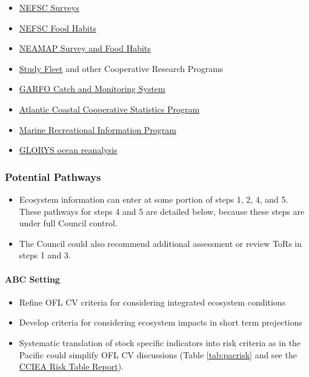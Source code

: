 \documentclass[
]{article}
\providecommand{\tightlist}{%
  \setlength{\itemsep}{0pt}\setlength{\parskip}{0pt}}
\begin{document}
\begin{itemize}
\tightlist
\item
  \href{https://www.fisheries.noaa.gov/inport/item/22549}{NEFSC Surveys}
\item
  \href{https://fwdp.shinyapps.io/tm2020/}{NEFSC Food Habits}
\item
  \href{https://www.vims.edu/research/units/programs/multispecies_fisheries_research/neamap/}{NEAMAP Survey and Food Habits}
\item
  \href{https://www.fisheries.noaa.gov/inport/item/27317}{Study Fleet} and other Cooperative Research Programs
\item
  \href{https://www.fisheries.noaa.gov/new-england-mid-atlantic/commercial-fishing/quota-monitoring-greater-atlantic-region}{GARFO Catch and Monitoring System}
\item
  \href{https://safis.accsp.org/accsp_prod/f?p=1490:1:6442641492940:::::}{Atlantic Coastal Cooperative Statistics Program}
\item
  \href{https://www.fisheries.noaa.gov/recreational-fishing-data/introduction-marine-recreational-information-program-data}{Marine Recreational Information Program}
\item
  \href{https://data.marine.copernicus.eu/product/GLOBAL_MULTIYEAR_PHY_001_030/description}{GLORYS ocean reanalysis}
\end{itemize}

\subsubsection{Potential Pathways}\label{potential-pathways-1}

\begin{itemize}
\tightlist
\item
  Ecosystem information can enter at some portion of steps 1, 2, 4, and 5. These pathways for steps 4 and 5 are detailed below, because these steps are under full Council control.
\item
  The Council could also recommend additional assessment or review ToRs in steps 1 and 3.
\end{itemize}

\paragraph{ABC Setting}\label{abc-setting}

\begin{itemize}
\tightlist
\item
  Refine OFL CV criteria for considering integrated ecosystem conditions
\item
  Develop criteria for considering ecosystem impacts in short term projections
\item
  Systematic translation of stock specific indicators into risk criteria as in the Pacific could simplify OFL CV discussions (Table \ref{tab:pacrisk} and see the \href{https://www.pcouncil.org/documents/2024/08/h-1-a-cciea-team-report-1-cciea-risk-table-report-on-fep-initiative-4.pdf/}{CCIEA Risk Table Report}).
\end{itemize}
\end{document}
